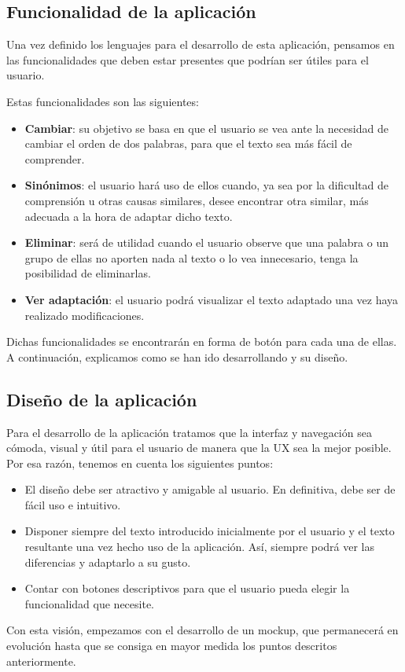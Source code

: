 \subsection{Funcionalidad de la aplicación}

Una vez definido los lenguajes para el desarrollo de esta aplicación, pensamos en las funcionalidades que deben estar presentes que podrían ser útiles para el usuario.

Estas funcionalidades son las siguientes:
\begin{itemize}
	\item \textbf{Cambiar}: su objetivo se basa en que el usuario se vea ante la necesidad de cambiar el orden de dos palabras, para que el texto sea más fácil de comprender.
	\item \textbf{Sinónimos}: el usuario hará uso de ellos cuando, ya sea por la dificultad de comprensión u otras causas similares, desee encontrar otra similar, más adecuada a la hora de adaptar dicho texto.
	\item \textbf{Eliminar}: será de utilidad cuando el usuario observe que una palabra o un grupo de ellas no aporten nada al texto o lo vea innecesario, tenga la posibilidad de eliminarlas.
	\item \textbf{Ver adaptación}: el usuario podrá visualizar el texto adaptado una vez haya realizado modificaciones.
\end{itemize}


Dichas funcionalidades se encontrarán en forma de botón para cada una de ellas.
A continuación, explicamos como se han ido desarrollando y su diseño.
\subsection{Diseño de la aplicación}

Para el desarrollo de la aplicación tratamos que la interfaz y navegación sea cómoda, visual y útil para el usuario de manera que la UX sea la mejor posible. Por esa razón, tenemos en cuenta los siguientes puntos:
\begin{itemize}
\item El diseño debe ser atractivo y amigable al usuario. En definitiva, debe ser de fácil uso e intuitivo.

\item Disponer siempre del texto introducido inicialmente por el usuario y el texto resultante una vez hecho uso de la aplicación. Así, siempre podrá ver las diferencias y adaptarlo a su gusto.


\item Contar con botones descriptivos para que el usuario pueda elegir la funcionalidad que necesite. 
\end{itemize}
Con esta visión, empezamos con el desarrollo de un mockup, que permanecerá en evolución hasta que se consiga en mayor medida los puntos descritos anteriormente.

